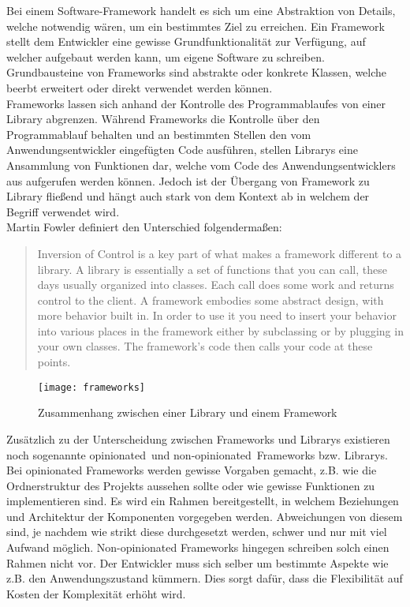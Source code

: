 Bei einem Software-Framework handelt es sich um eine Abstraktion von Details, welche notwendig wären, um ein bestimmtes Ziel zu erreichen. Ein Framework stellt dem Entwickler eine gewisse Grundfunktionalität zur Verfügung, auf welcher aufgebaut werden kann, um eigene Software zu schreiben. Grundbausteine von Frameworks sind abstrakte oder konkrete Klassen, welche beerbt erweitert oder direkt verwendet werden können.\\

Frameworks lassen sich anhand der Kontrolle des Programmablaufes von einer Library abgrenzen. Während Frameworks die Kontrolle über den Programmablauf behalten und an bestimmten Stellen den vom Anwendungsentwickler eingefügten Code ausführen, stellen Librarys eine Ansammlung von Funktionen dar, welche vom Code des Anwendungsentwicklers aus aufgerufen werden können. Jedoch ist der Übergang von Framework zu Library fließend und hängt auch stark von dem Kontext ab in welchem der Begriff verwendet wird.\\

Martin Fowler definiert den Unterschied folgendermaßen:

\blockcquote{fowler1}{
	\glqq Inversion of Control is a key part of what makes a framework different to a library. A library is essentially a set of functions that you can call, these days usually organized into classes. Each call does some work and returns control to the client.
	A framework embodies some abstract design, with more behavior  built in. In order to use it you need to insert your behavior into various places in the framework either by subclassing or by plugging in your own classes. The framework's code then calls your code at these points.\grqq
}

\begin{figure}[h]
	\texttt{[image: frameworks]}
	\centering
	\caption{Zusammenhang zwischen einer Library und einem Framework}
\end{figure}

\newpage

Zusätzlich zu der Unterscheidung zwischen Frameworks und Librarys existieren noch sogenannte \glqq opinionated\grqq\ und \glqq non-opinionated\grqq\ Frameworks bzw. Librarys. Bei opinionated Frameworks werden gewisse Vorgaben gemacht, z.B. wie die Ordnerstruktur des Projekts aussehen sollte oder wie gewisse Funktionen zu implementieren sind. Es wird ein Rahmen bereitgestellt, in welchem Beziehungen und Architektur der Komponenten vorgegeben werden. Abweichungen von diesem sind, je nachdem wie strikt diese durchgesetzt werden, schwer und nur mit viel Aufwand möglich. Non-opinionated Frameworks hingegen schreiben solch einen Rahmen nicht vor. Der Entwickler muss sich selber um bestimmte Aspekte wie z.B. den Anwendungszustand kümmern. Dies sorgt dafür, dass die Flexibilität auf Kosten der Komplexität erhöht wird\cite{opinionated}.\\

